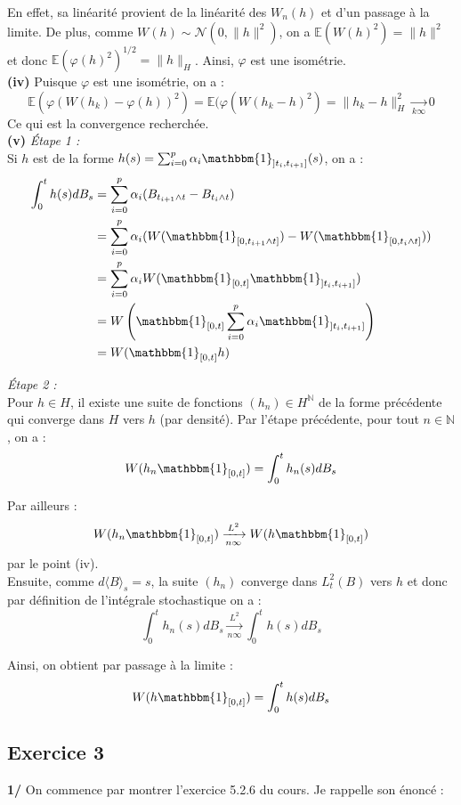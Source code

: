 \documentclass[a4paper,12pt]{article}
\newcommand{\E}{\mathbb{E}}
\newcommand{\ind}{\mathbbm{1}}
\newcommand{\n}{\mathbb{N}}
\newcommand{\norm}{\mathcal{N}}
\begin{document}
En effet, sa linéarité provient de la linéarité des $W_n(h)$ et d'un passage à la limite. De plus, comme $W(h) \sim \norm (0, \|h\|^2)$, on a $\E (W(h)^2) = \|h \|^2$ et donc $\E \left( \varphi(h)^2 \right)^{1/2} = \|h \|_H$. Ainsi, $\varphi$ est une isométrie. \\

\textbf{(iv)} Puisque $\varphi$ est une isométrie, on a :
$$\E ( \varphi (W(h_k) - \varphi(h))^2 ) =  \E ( \varphi (W(h_k - h)^2 )= \|h_k-h\|_H^2 \xrightarrow[k \infty]{} 0 $$
Ce qui est la convergence recherchée. \\

\textbf{(v)} \textit{Étape 1 :} \\
Si $h$ est de la forme $h(s)=\sum_{i=0}^p \alpha_i \ind_{]t_i, t_{i+1}]} (s)$, on a :
\begin{align*}
\int_0^t h(s) dB_s & = \sum_{i=0}^p \alpha_i (B_{t_{i+1} \wedge t} - B_{t_i \wedge t}) \\
& = \sum_{i=0}^p \alpha_i (W ( \ind_{[0, t_{i+1} \wedge t]} )-W(\ind_{[0, t_{i} \wedge t]})) \\
& = \sum_{i=0}^p \alpha_i W ( \ind_{[0,t]} \ind_{]t_i, t_{i+1}]} ) \\
& = W \left( \ind_{[0,t]} \sum_{i=0}^p \alpha_i \ind_{]t_i, t_{i+1}]} \right) \\
& = W (\ind_{[0,t]} h)
\end{align*}

\textit{Étape 2 :} \\
Pour $h \in H$, il existe une suite de fonctions $(h_n) \in H^{\n}$ de la forme précédente qui converge dans $H$ vers $h$ (par densité). Par l'étape précédente, pour tout $n \in \n$, on a :
$$W (h_n \ind_{[0,t]}) = \int_0^t h_n(s) dB_s$$

Par ailleurs :
$$W(h_n \ind_{[0,t]}) \xrightarrow[n \infty]{L^2} W(h \ind_{[0,t]}) $$
par le point (iv). \\

Ensuite, comme $d \langle B \rangle_s = s$, la suite $(h_n)$ converge dans $L^2_t(B)$ vers $h$ et donc par définition de l'intégrale stochastique on a :
$$\int_0^t h_n (s) dB_s \xrightarrow[n \infty]{L^2} \int_0^t h(s) dB_s$$

Ainsi, on obtient par passage à la limite :
$$W (h \ind_{[0,t]}) = \int_0^t h(s) dB_s$$

\subsection{Exercice 3}
\textbf{1/} On commence par montrer l'exercice 5.2.6 du cours. Je rappelle son énoncé : \\
\end{document}
